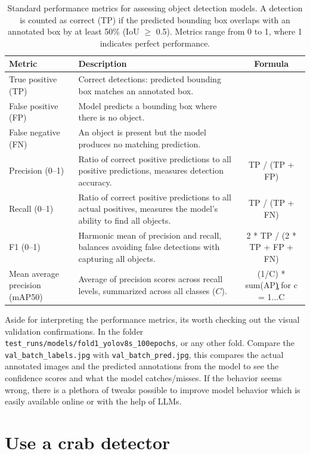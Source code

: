 \documentclass[
]{book}
\begin{document}
\begin{table}

\caption{\label{tab:cnnMetricsdef}Standard performance metrics for assessing object detection models. A detection is counted as correct (TP) if the predicted bounding box overlaps with an annotated box by at least 50\% (IoU $\geq$ 0.5). Metrics range from 0 to 1, where 1 indicates perfect performance.}
\centering
\begin{tabular}[t]{llc}
\toprule
Metric & Description & Formula\\
\midrule
True positive (TP) & Correct detections: predicted bounding box matches an annotated box. & \\
False positive (FP) & Model predicts a bounding box where there is no object. & \\
False negative (FN) & An object is present but the model produces no matching prediction. & \\
Precision (0--1) & Ratio of correct positive predictions to all positive predictions, measures detection accuracy. & TP / (TP + FP)\\
Recall (0--1) & Ratio of correct positive predictions to all actual positives, measures the model's ability to find all objects. & TP / (TP + FN)\\
\addlinespace
F1 (0--1) & Harmonic mean of precision and recall, balances avoiding false detections with capturing all objects. & 2 * TP / (2 * TP + FP + FN)\\
Mean average precision (mAP50) & Average of precision scores across recall levels, summarized across all classes ($C$). & (1/C) * sum(AP\c) for c = 1...C\\
\bottomrule
\end{tabular}
\end{table}

Aside for interpreting the performance metrics, its worth checking out the visual validation confirmations. In the folder \texttt{test\_runs/models/fold1\_yolov8s\_100epochs}, or any other fold. Compare the \texttt{val\_batch\_labels.jpg} with \texttt{val\_batch\_pred.jpg}, this compares the actual annotated images and the predicted annotations from the model to see the confidence scores and what the model catches/misses. If the behavior seems wrong, there is a plethora of tweaks possible to improve model behavior which is easily available online or with the help of LLMs.

\chapter{Use a crab detector}\label{use-a-crab-detector}
\end{document}
